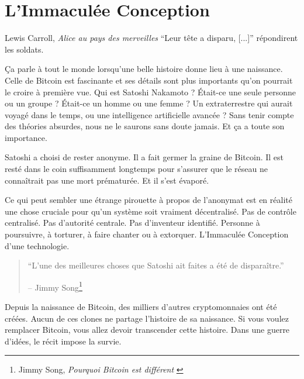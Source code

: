 \chapter{L'Immaculée Conception}
\label{les:5}

\begin{chapquote}{Lewis Carroll, \textit{Alice au pays des merveilles}}
\enquote{Leur tête a disparu, [...]} répondirent les soldats.
\end{chapquote}

Ça parle à tout le monde lorsqu'une belle histoire donne lieu à une naissance.
Celle de Bitcoin est fascinante et ses détails sont plus importants qu'on
pourrait le croire à première vue. Qui est Satoshi Nakamoto ? Était-ce une seule
personne ou un groupe ? Était-ce un homme ou une femme ? Un extraterrestre qui
aurait voyagé dans le temps, ou une intelligence artificielle avancée ? Sans
tenir compte des théories absurdes, nous ne le saurons sans doute jamais. Et ça
a toute son importance.

Satoshi a choisi de rester anonyme. Il a fait germer la graine de Bitcoin. Il
est resté dans le coin suffisamment longtemps pour s'assurer que le réseau ne
connaîtrait pas une mort prématurée. Et il s'est évaporé.

Ce qui peut sembler une étrange pirouette à propos de l'anonymat est en réalité
une chose cruciale pour qu'un système soit vraiment décentralisé. Pas de
contrôle centralisé. Pas d'autorité centrale. Pas d'inventeur identifié.
Personne à poursuivre, à torturer, à faire chanter ou à extorquer. L'Immaculée
Conception d'une technologie.

\begin{quotation}\begin{samepage}
\enquote{L'une des meilleures choses que Satoshi ait faites a été de
disparaître.}
\begin{flushright} -- Jimmy Song\footnote{Jimmy Song, \textit{Pourquoi Bitcoin
est différent} \cite{bitcoin-different}}
\end{flushright}\end{samepage}\end{quotation}

\newpage

Depuis la naissance de Bitcoin, des milliers d'autres cryptomonnaies ont été
créées. Aucun de ces clones ne partage l'histoire de sa naissance. Si vous
voulez remplacer Bitcoin, vous allez devoir transcender cette histoire. Dans une
guerre d'idées, le récit impose la survie.


